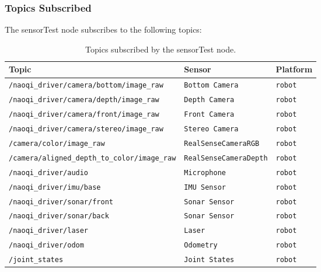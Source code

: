\documentclass{CSSRforAfrica}
\begin{document}
\subsubsection*{Topics Subscribed}
The sensorTest node subscribes to the following topics:
\begin{longtable}[c]{|p{8cm}|p{4.2cm}|l|}
	\caption{Topics subscribed by the sensorTest node.} \label{tab:subscribed_topics}\\
	\hline
	\rowcolor{gray!30}
	\small{\textbf{Topic}} & \small{\textbf{Sensor}} & \small{\textbf{Platform}} \\ \hline
	\endhead %
	
	\small{\texttt{/naoqi\_driver/camera/bottom/image\_raw}} & \small{\texttt{Bottom Camera}} & \small{\texttt{robot}} \\ \hline
	\small{\texttt{/naoqi\_driver/camera/depth/image\_raw}} & \small{\texttt{Depth Camera}} & \small{\texttt{robot}} \\ \hline
	\small{\texttt{/naoqi\_driver/camera/front/image\_raw}} & \small{\texttt{Front Camera}} & \small{\texttt{robot}} \\ \hline
	\small{\texttt{/naoqi\_driver/camera/stereo/image\_raw}} & \small{\texttt{Stereo Camera}} & \small{\texttt{robot}} \\ \hline
	\small{\texttt{/camera/color/image\_raw}} & \small{\texttt{RealSenseCameraRGB}} & \small{\texttt{robot}} \\ \hline
	\small{\texttt{/camera/aligned\_depth\_to\_color/image\_raw}} & \small{\texttt{RealSenseCameraDepth}} & \small{\texttt{robot}} \\ \hline
	\small{\texttt{/naoqi\_driver/audio}} & \small{\texttt{Microphone}} & \small{\texttt{robot}} \\ \hline
	\small{\texttt{/naoqi\_driver/imu/base}} & \small{\texttt{IMU Sensor}} & \small{\texttt{robot}} \\ \hline
	\small{\texttt{/naoqi\_driver/sonar/front}} & \small{\texttt{Sonar Sensor}} & \small{\texttt{robot}} \\ \hline
	\small{\texttt{/naoqi\_driver/sonar/back}} & \small{\texttt{Sonar Sensor}} & \small{\texttt{robot}} \\ \hline
	\small{\texttt{/naoqi\_driver/laser}} & \small{\texttt{Laser}} & \small{\texttt{robot}} \\ \hline
	\small{\texttt{/naoqi\_driver/odom}} & \small{\texttt{Odometry}} & \small{\texttt{robot}} \\ \hline
	\small{\texttt{/joint\_states}} & \small{\texttt{Joint States}} & \small{\texttt{robot}} \\ \hline

\end{longtable}
\end{document}
